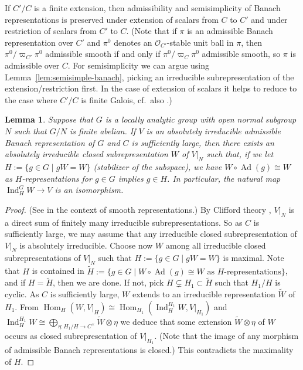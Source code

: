 \documentclass[a4paper]{amsart}
\numberwithin{equation}{section}
\newtheorem{lem}[thm]{Lemma}
\theoremstyle{remark}
\theoremstyle{definition}
\DeclareMathOperator{\Ind}{Ind}
\DeclareMathOperator{\Hom}{Hom}
\DeclareMathOperator{\Ad}{Ad}
\renewcommand{\simeq}{\cong}
\newcommand{\wt}[1]{\widetilde{#1}}
\begin{document}
If $C'/C$ is a finite extension, then admissibility and semisimplicity of Banach representations is preserved under extension of scalars from $C$ to $C'$ and under restriction of scalars from $C'$ to $C$.
(Note that if $\pi$ is an admissible Banach representation over $C'$ and $\pi^0$ denotes an $\mathcal O_{C'}$-stable unit ball in $\pi$, then $\pi^0/\varpi_{C'} \pi^0$ admissible smooth if and only if $\pi^0/\varpi_C \pi^0$ admissible smooth, so $\pi$ is admissible over $C$.
For semisimplicity we can argue using Lemma~\ref{lem:semisimple-banach}, picking an irreducible subrepresentation of the extension/restriction first.
In the case of extension of scalars it helps to reduce to the case where $C'/C$ is finite Galois, cf.\ also \cite[Lemma 3.7]{MR3053464}.)


\begin{lem}\label{lem:roche}
  Suppose that $G$ is a locally analytic group with open normal subgroup $N$ such that $G/N$ is finite abelian.
  If $V$ is an absolutely irreducible admissible Banach representation of $G$ and $C$ is sufficiently large, 
  then there exists an absolutely irreducible closed subrepresentation $W$ of $V|_N$ such that, if we let $H := \{g\in G\mid gW = W\}$ (stabilizer of the subspace), we have
   $W \circ \Ad(g) \cong W$ as $H$-representations for $g \in G$ implies $g \in H$.
  In particular, the natural map $\Ind_H^G W \to V$ is an isomorphism.
\end{lem}


\begin{proof}
  (See \cite[1.6.3]{MR2508719} in the context of smooth representations.)
  By Clifford theory \cite[Proposition~2.1.1]{arxiv.1912.11125}, $V|_N$ is a direct sum of finitely many irreducible subrepresentations.
  So as $C$ is sufficiently large, we may assume that any irreducible closed subrepresentation of $V|_N$ is absolutely irreducible.
  Choose now $W$ among all irreducible closed subrepresentations of $V|_N$ such that $H := \{g\in G\mid gW = W\}$ is maximal.
  Note that $H$ is contained in $\wt H := \{g\in G\mid \text{$W\circ\Ad(g)\simeq W$ as $H$-representations}\}$, and if $H = \wt H$, then we are done.
  If not, pick $H \subsetneq H_1 \subset \wt H$ such that $H_1/H$ is cyclic.   As $C$ is sufficiently large, $W$ extends to an irreducible representation $\wt W$ of $H_1$.
  From $\Hom_H(W,V|_H) \cong \Hom_{H_1}(\Ind_H^{H_1} W,V|_{H_1})$ and $\Ind_H^{H_1} W \cong \bigoplus_{\eta:H_1/H \to C^\times} \wt W \otimes \eta$
  we deduce that some extension $\wt W \otimes \eta$ of $W$ occurs as closed subrepresentation of $V|_{H_1}$.
  (Note that the image of any morphism of admissible Banach representations is closed.)
  This contradicts the maximality of $H$.
\end{proof}
\end{document}
